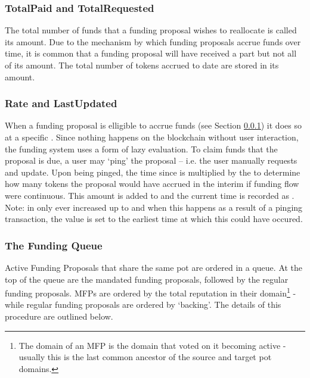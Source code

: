 \subsubsection*{TotalPaid and TotalRequested}
The total number of funds that a funding proposal wishes to reallocate is called its  amount. Due to the mechanism by which funding proposals accrue funds over time, it is common that a funding proposal will have received a part but not all of its  amount. The total number of tokens accrued to date are stored in its  amount. 

\subsubsection*{Rate and LastUpdated}
When a funding proposal is elligible to accrue funds (see Section \ref{subsec:funding-queue}) it does so at a specific . Since nothing happens on the blockchain without user interaction, the funding system uses a form of lazy evaluation. To claim funds that the proposal is due, a user may `ping' the proposal -- i.e. the user manually requests and update. Upon being pinged, the time since  is multiplied by the  to determine how many tokens the proposal would have accrued in the interim if funding flow were continuous. This amount is added to  and the current time is recorded as .\\
Note:  in only ever increased up to  and when this happens as a result of a pinging transaction, the  value is set to the earliest time at which this could have occured.

\subsubsection{The Funding Queue}\label{subsec:funding-queue}
Active Funding Proposals that share the same  pot are ordered in a queue. At the top of the queue are the mandated funding proposals, followed by the regular funding proposals. MFPs are ordered by the total reputation in their domain\footnote{The domain of an MFP is the domain that voted on it becoming active - usually this is the last common ancestor of the source and target pot domains.} - while regular funding proposals are ordered by `backing'.  The details of this procedure are outlined below.\\



